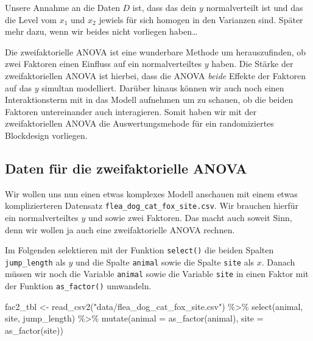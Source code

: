 \documentclass[
  letterpaper,
]{scrbook}
\newenvironment{Shaded}{\begin{snugshade}}{\end{snugshade}}
\newcommand{\AttributeTok}[1]{\textcolor[rgb]{0.40,0.45,0.13}{#1}}
\newcommand{\FunctionTok}[1]{\textcolor[rgb]{0.28,0.35,0.67}{#1}}
\newcommand{\NormalTok}[1]{\textcolor[rgb]{0.00,0.23,0.31}{#1}}
\newcommand{\OtherTok}[1]{\textcolor[rgb]{0.00,0.23,0.31}{#1}}
\newcommand{\SpecialCharTok}[1]{\textcolor[rgb]{0.37,0.37,0.37}{#1}}
\newcommand{\StringTok}[1]{\textcolor[rgb]{0.13,0.47,0.30}{#1}}
\begin{document}
Unsere Annahme an die Daten \(D\) ist, dass das dein \(y\)
normalverteilt ist und das die Level vom \(x_1\) und \(x_2\) jewiels für
sich homogen in den Varianzen sind. Später mehr dazu, wenn wir beides
nicht vorliegen haben\ldots{}

Die zweifaktorielle ANOVA ist eine wunderbare Methode um herauszufinden,
ob zwei Faktoren einen Einfluss auf ein normalverteiltes \(y\) haben.
Die Stärke der zweifaktoriellen ANOVA ist hierbei, dass die ANOVA
\emph{beide} Effekte der Faktoren auf das \(y\) simultan modelliert.
Darüber hinaus können wir auch noch einen Interaktionsterm mit in das
Modell aufnehmen um zu schauen, ob die beiden Faktoren untereinander
auch interagieren. Somit haben wir mit der zweifaktoriellen ANOVA die
Auswertungsmehode für ein randomiziertes Blockdesign vorliegen.

\hypertarget{daten-fuxfcr-die-zweifaktorielle-anova}{%
\subsection{Daten für die zweifaktorielle
ANOVA}\label{daten-fuxfcr-die-zweifaktorielle-anova}}

Wir wollen uns nun einen etwas komplexes Modell anschauen mit einem
etwas komplizierteren Datensatz \texttt{flea\_dog\_cat\_fox\_site.csv}.
Wir brauchen hierfür ein normalverteiltes \(y\) und sowie zwei Faktoren.
Das macht auch soweit Sinn, denn wir wollen ja auch eine zweifaktorielle
ANOVA rechnen.

Im Folgenden selektieren mit der Funktion \texttt{select()} die beiden
Spalten \texttt{jump\_length} als \(y\) und die Spalte \texttt{animal}
sowie die Spalte \texttt{site} als \(x\). Danach müssen wir noch die
Variable \texttt{animal} sowie die Variable \texttt{site} in einen
Faktor mit der Funktion \texttt{as\_factor()} umwandeln.

\begin{Shaded}
\begin{Highlighting}[]
\NormalTok{fac2\_tbl }\OtherTok{\textless{}{-}} \FunctionTok{read\_csv2}\NormalTok{(}\StringTok{"data/flea\_dog\_cat\_fox\_site.csv"}\NormalTok{) }\SpecialCharTok{\%\textgreater{}\%} 
  \FunctionTok{select}\NormalTok{(animal, site, jump\_length) }\SpecialCharTok{\%\textgreater{}\%} 
  \FunctionTok{mutate}\NormalTok{(}\AttributeTok{animal =} \FunctionTok{as\_factor}\NormalTok{(animal),}
         \AttributeTok{site =} \FunctionTok{as\_factor}\NormalTok{(site))}
\end{Highlighting}
\end{Shaded}
\end{document}
